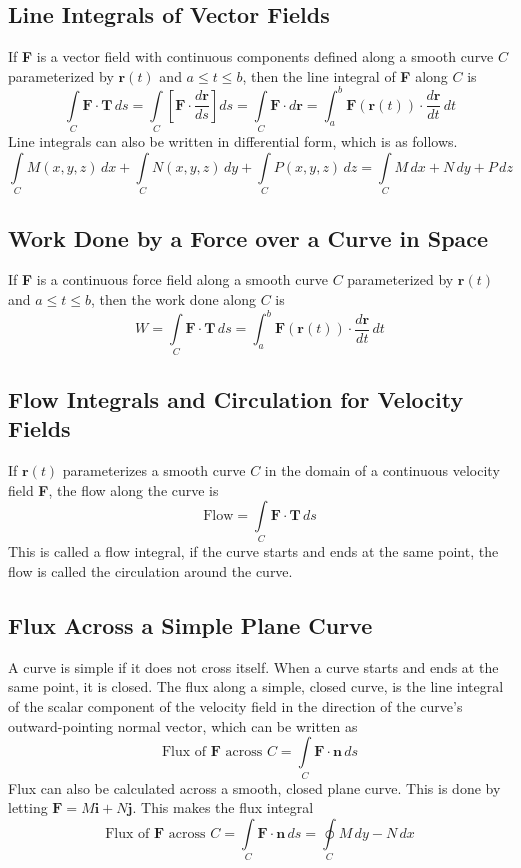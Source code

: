 \documentclass{article}
\begin{document}
\subsection*{Line Integrals of Vector Fields}
If \textbf{F} is a vector field with continuous components defined along a smooth curve \(C\) parameterized by \(\textbf{r}(t)\) and \(a\leq t\leq b\), then the line integral of \textbf{F} along \(C\) is
\[\int\limits_C\textbf{F}\cdot\textbf{T}\,ds=\int\limits_C\left[\textbf{F}\cdot\frac{d\textbf{r}}{ds}\right]ds=\int\limits_C\textbf{F}\cdot d\textbf{r}=\int_a^b\textbf{F}(\textbf{r}(t))\cdot \frac{d\textbf{r}}{dt}\,dt\]
Line integrals can also be written in differential form, which is as follows.
\[\int\limits_CM(x,y,z)\,dx+\int\limits_CN(x,y,z)\,dy+\int\limits_CP(x,y,z)\,dz=\int\limits_CM\,dx+N\,dy+P\,dz\]
\subsection*{Work Done by a Force over a Curve in Space}
If \textbf{F} is a continuous force field along a smooth curve \(C\) parameterized by \(\textbf{r}(t)\) and \(a\leq t\leq b\), then the work done along \(C\) is
\[W=\int\limits_C\textbf{F}\cdot\textbf{T}\,ds=\int_a^b\textbf{F}(\textbf{r}(t))\cdot \frac{d\textbf{r}}{dt}\,dt\]
\subsection*{Flow Integrals and Circulation for Velocity Fields}
If \(\textbf{r}(t)\) parameterizes a smooth curve \(C\) in the domain of a continuous velocity field \textbf{F}, the flow along the curve is
\[\text{Flow}=\int\limits_C\textbf{F}\cdot\textbf{T}\,ds\]
This is called a flow integral, if the curve starts and ends at the same point, the flow is called the circulation around the curve.
\subsection*{Flux Across a Simple Plane Curve}
A curve is simple if it does not cross itself. When a curve starts and ends at the same point, it is closed. The flux along a simple, closed curve, is the line integral of the scalar component of the velocity field in the direction of the curve's outward-pointing normal vector, which can be written as
\[\text{Flux of }\textbf{F}\text{ across }C=\int\limits_C\textbf{F}\cdot\textbf{n}\,ds\]
Flux can also be calculated across a smooth, closed plane curve. This is done by letting \(\textbf{F}=M\textbf{i}+N\textbf{j}\). This makes the flux integral
\[\text{Flux of }\textbf{F}\text{ across }C=\int\limits_C\textbf{F}\cdot\textbf{n}\,ds=\oint\limits_CM\,dy-N\,dx\]
\end{document}
